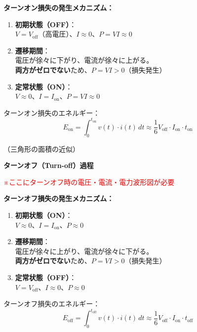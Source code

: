 \begin{screen}
\textbf{ターンオン損失の発生メカニズム：}

\begin{enumerate}
\item \textbf{初期状態（OFF）}：\\
$V = V_{\text{off}}$（高電圧）、$I \approx 0$、$P = VI \approx 0$

\item \textbf{遷移期間}：\\
電圧が徐々に下がり、電流が徐々に上がる。\\
\textbf{両方がゼロでない}ため、$P = VI > 0$（損失発生）

\item \textbf{定常状態（ON）}：\\
$V \approx 0$、$I = I_{\text{on}}$、$P = VI \approx 0$
\end{enumerate}

ターンオン損失のエネルギー：
\begin{equation}
E_{\text{on}} = \int_0^{t_{\text{on}}} v(t) \cdot i(t) \, dt \approx \frac{1}{6} V_{\text{off}} \cdot I_{\text{on}} \cdot t_{\text{on}}
\end{equation}

（三角形の面積の近似）
\end{screen}

\textbf{ターンオフ（Turn-off）過程}

\textcolor{red}{※ここにターンオフ時の電圧・電流・電力波形図が必要}

\begin{screen}
\textbf{ターンオフ損失の発生メカニズム：}

\begin{enumerate}
\item \textbf{初期状態（ON）}：\\
$V \approx 0$、$I = I_{\text{on}}$、$P \approx 0$

\item \textbf{遷移期間}：\\
電圧が徐々に上がり、電流が徐々に下がる。\\
\textbf{両方がゼロでない}ため、$P = VI > 0$（損失発生）

\item \textbf{定常状態（OFF）}：\\
$V = V_{\text{off}}$、$I \approx 0$、$P \approx 0$
\end{enumerate}

ターンオフ損失のエネルギー：
\begin{equation}
E_{\text{off}} = \int_0^{t_{\text{off}}} v(t) \cdot i(t) \, dt \approx \frac{1}{6} V_{\text{off}} \cdot I_{\text{on}} \cdot t_{\text{off}}
\end{equation}
\end{screen}

